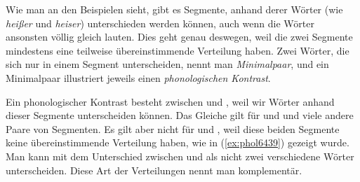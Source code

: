 \begin{exe}
  \ex\label{ex:phol6438}
    \begin{xlist}
    \end{xlist}
  \ex\label{ex:phol6440}
    \begin{xlist}
    \end{xlist}
\end{exe}

Wie man an den Beispielen sieht, gibt es Segmente, anhand derer Wörter (wie \textit{heißer} und \textit{heiser}) unterschieden werden können, auch wenn die Wörter ansonsten völlig gleich lauten.
Dies geht genau deswegen, weil die zwei Segmente mindestens eine teilweise übereinstimmende Verteilung haben.
Zwei Wörter, die sich nur in einem Segment unterscheiden, nennt man \textit{Minimalpaar}, und ein Minimalpaar illustriert jeweils einen \textit{phonologischen Kontrast}.


Ein phonologischer Kontrast besteht \zB zwischen \textipa{[t]} und \textipa{[k]}, weil wir Wörter anhand dieser Segmente unterscheiden können.
Das Gleiche gilt für \textipa{[s]} und \textipa{[z]} und viele andere Paare von Segmenten.
Es gilt aber nicht für \textipa{[h]} und \textipa{[N]}, weil diese beiden Segmente keine übereinstimmende Verteilung haben, wie in (\ref{ex:phol6439}) gezeigt wurde.
Man kann mit dem Unterschied zwischen \textipa{[h]} und \textipa{[N]} als nicht zwei verschiedene Wörter unterscheiden.
Diese Art der Verteilungen nennt man komplementär.


